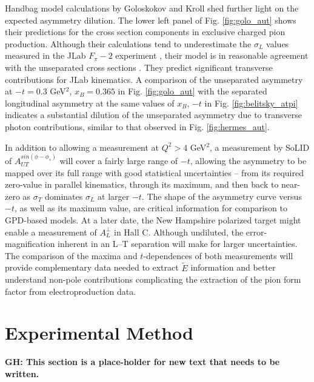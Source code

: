 \documentclass[preprint,superscriptaddress]{revtex4}
\begin{document}
Handbag model calculations by Goloskokov and Kroll \cite{GoPC} shed further
light on the expected asymmetry dilution.  The lower left panel of
Fig. \ref{fig:golo_aut} shows their predictions for the cross section
components in exclusive charged pion production.  Although their calculations
tend to underestimate the $\sigma_L$ values measured in the JLab $F_{\pi}-2$
experiment \cite{Fpi2}, their model is in reasonable agreement with the
unseparated cross sections \cite{Go10}.  They predict significant transverse
contributions for JLab kinematics.  A comparison of the unseparated asymmetry
at $-t=0.3$ GeV$^2$, $x_B=0.365$ in Fig. \ref{fig:golo_aut} with the separated
longitudinal asymmetry at the same values of $x_B$, $-t$ in
Fig. \ref{fig:belitsky_atpi} indicates a substantial dilution of the
unseparated asymmetry due to transverse photon contributions, similar to that
observed in Fig. \ref{fig:hermes_aut}.

In addition to allowing a measurement at $Q^2>4$ GeV$^2$, a measurement by
SoLID of $A_{UT}^{sin(\phi-\phi_s)}$ will cover a fairly large range of $-t$,
allowing the asymmetry to be mapped over its full range with good statistical
uncertainties -- from its required zero-value in parallel kinematics, through
its maximum, and then back to near-zero as $\sigma_T$ dominates $\sigma_L$ at
larger $-t$.  The shape of the asymmetry curve versus $-t$, as well as its
maximum value, are critical information for comparison to GPD-based models.  At
a later date, the New Hampshire polarized target might enable a measurement of
$A_L^{\perp}$ in Hall C.  Although undiluted, the error-magnification
inherent in an L--T separation will make for larger uncertainties.  The
comparison of the maxima and $t$-dependences of both measurements will provide
complementary data needed to extract $\tilde{E}$ information and better
understand non-pole contributions complicating the extraction of the pion form
factor from electroproduction data.

\section{Experimental Method}

{\bf{GH: This section is a place-holder for new text that needs to be
    written.}}
\end{document}
